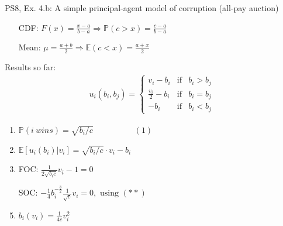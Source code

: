 \begin{frame}{PS8, Ex. 4.b: A simple principal-agent model of corruption (all-pay auction)}
\begin{multicols}{2}
\begin{itemize}
        \item[CDF:] $F(x)=\frac{x-a}{b-a}\Rightarrow\mathbb{P}(c>x)=\frac{c-a}{b-a}$
        \item[Mean:] $\mu=\frac{a+b}{2}\Rightarrow\mathbb{E}(c<x)=\frac{a+x}{2}$
      \end{itemize}
      \vspace{-6pt}
      Results so far: \vspace{-6pt}
      \begin{align*}
        u_i(b_i,b_j)=\left\{\begin{array}{lcl}
          v_i-b_i           & \text{if} & b_i>b_j \\
          \frac{v_i}{2}-b_i & \text{if} & b_i=b_j \\
          -b_i              & \text{if} & b_i<b_j
        \end{array}\right.
      \end{align*} \vspace{-16pt}
      \begin{enumerate}
        \item $\mathbb{P}(i\ wins)=\sqrt{b_i/c}\quad\quad\quad\quad\quad(1)$
        \item $\mathbb{E}[u_i(b_i)|v_i]=\sqrt{b_i/c}\cdot v_i-b_i$
        \item FOC: $\frac{1}{2\sqrt{b_ic}}v_i-1=0$
        \item[] SOC: $-\frac{1}{4}b_i^{-\frac{3}{2}}\frac{1}{\sqrt{c}}v_i=0,\text{ using }(**)$
        \item $b_i(v_i)=\frac{1}{4c}v_i^2$
      \end{enumerate}
      \vfill\null
    \end{multicols}
\end{frame}
